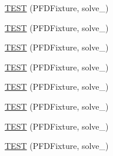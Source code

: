 \begin{DoxyCompactItemize}
\hyperlink{TestPFD_8c_09_09_a0bfee5bdfce5835ee3c258c88e61ccef}{\-T\-E\-S\-T} (\-P\-F\-D\-Fixture, solve\-\_)
\item 
\hyperlink{TestPFD_8c_09_09_ad8fe4b88c588f742bf125c129fa3d94f}{\-T\-E\-S\-T} (\-P\-F\-D\-Fixture, solve\-\_)
\item 
\hyperlink{TestPFD_8c_09_09_a14f18a21a33a984099d707bf7ff31804}{\-T\-E\-S\-T} (\-P\-F\-D\-Fixture, solve\-\_)
\item 
\hyperlink{TestPFD_8c_09_09_a6a02f042348fec59bd2eb47aba60a21b}{\-T\-E\-S\-T} (\-P\-F\-D\-Fixture, solve\-\_)
\item 
\hyperlink{TestPFD_8c_09_09_ae8c7370b9ca28631c2e20bd27732f644}{\-T\-E\-S\-T} (\-P\-F\-D\-Fixture, solve\-\_)
\item 
\hyperlink{TestPFD_8c_09_09_a2b39ebfcf51cbff742fd853c18e64018}{\-T\-E\-S\-T} (\-P\-F\-D\-Fixture, solve\-\_)
\item 
\hyperlink{TestPFD_8c_09_09_a9bdceab5af2de150de815fc1cf7ed672}{\-T\-E\-S\-T} (\-P\-F\-D\-Fixture, solve\-\_)
\item 
\hyperlink{TestPFD_8c_09_09_a6f6d464d4394c5f1979fe92ba395f9d4}{\-T\-E\-S\-T} (\-P\-F\-D\-Fixture, solve\-\_)
\end{DoxyCompactItemize}


